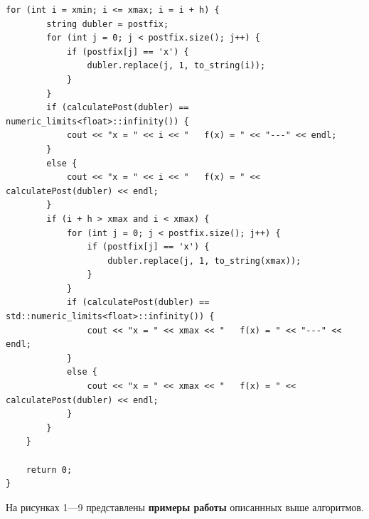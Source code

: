 \documentclass[12pt, a4paper]{article}
\begin{document}
\begin{lstlisting}[caption={Исходный код}, label={lst:label1}]
    for (int i = xmin; i <= xmax; i = i + h) {
        string dubler = postfix;
        for (int j = 0; j < postfix.size(); j++) {
            if (postfix[j] == 'x') {
                dubler.replace(j, 1, to_string(i));
            }
        }
        if (calculatePost(dubler) == numeric_limits<float>::infinity()) {
            cout << "x = " << i << "   f(x) = " << "---" << endl;
        }
        else {
            cout << "x = " << i << "   f(x) = " << calculatePost(dubler) << endl;
        }
        if (i + h > xmax and i < xmax) {
            for (int j = 0; j < postfix.size(); j++) {
                if (postfix[j] == 'x') {
                    dubler.replace(j, 1, to_string(xmax));
                }
            }
            if (calculatePost(dubler) == std::numeric_limits<float>::infinity()) {
                cout << "x = " << xmax << "   f(x) = " << "---" << endl;
            }
            else {
                cout << "x = " << xmax << "   f(x) = " << calculatePost(dubler) << endl;
            }
        }
    }

    return 0;
}
\end{lstlisting}
\newpage
На рисунках 1---9 представлены \textbf{примеры работы} описаннных выше 
алгоритмов.
\end{document}
